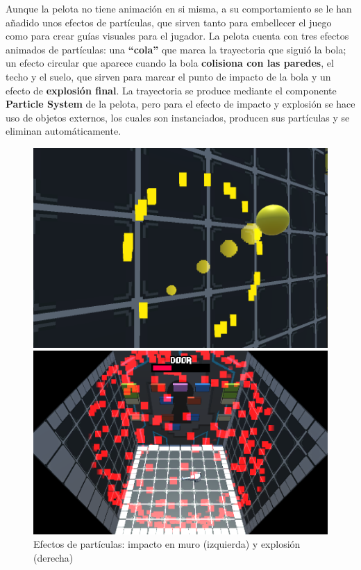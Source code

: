 Aunque la pelota no tiene animación en si misma, a su comportamiento se le han añadido unos efectos de partículas, que sirven tanto para embellecer el juego como para crear guías visuales para el jugador. La pelota cuenta con tres efectos animados de partículas: una \textbf{``cola''} que marca la trayectoria que siguió la bola; un efecto circular que aparece cuando la bola \textbf{colisiona con las paredes}, el techo y el suelo, que sirven para marcar el punto de impacto de la bola y un efecto de \textbf{explosión final}. La trayectoria se produce mediante el componente \textbf{Particle System} de la pelota, pero para el efecto de impacto y explosión se hace uso de objetos externos, los cuales son instanciados, producen sus partículas y se eliminan automáticamente.
\begin{figure}[!htb]
   \begin{minipage}{0.48\textwidth}
     \centering
     \includegraphics[width=0.7\linewidth, right]{images/estructura/fisica/ball_hit}
   \end{minipage}\hfill
   \begin {minipage}{0.48\textwidth}
     \centering
     \includegraphics[width=0.7\linewidth, left]{images/estructura/objetos/ball_explosion}
   \end{minipage}
   \caption{Efectos de partículas: impacto en muro (izquierda) y explosión (derecha)}
\end{figure}

